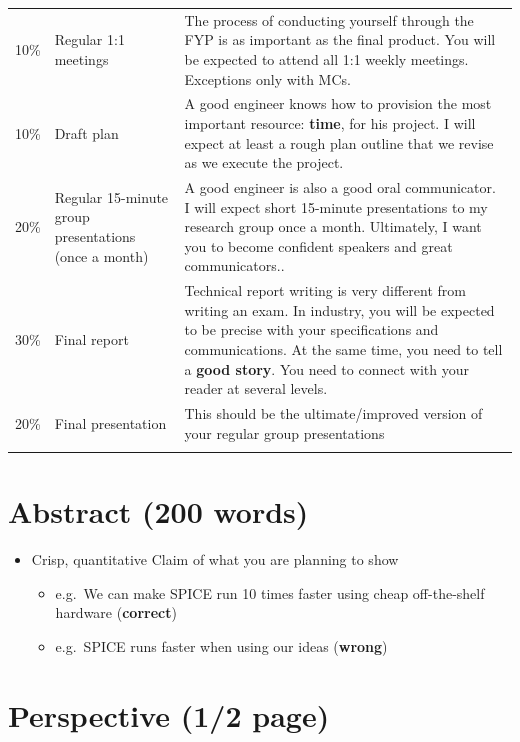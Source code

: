 \begin{longtable}[c]{@{}llp{4cm}@{}}
\hline\noalign{\medskip}
10\% & Regular 1:1 meetings & The process of conducting
yourself through the FYP is as important as the final
product. You will be expected to attend all 1:1 weekly
meetings. Exceptions only with MCs.
\\\noalign{\medskip}
10\% & Draft plan & A good engineer knows how to provision
the most important resource: \textbf{time}, for his project.
I will expect at least a rough plan outline that we revise
as we execute the project.
\\\noalign{\medskip}
20\% & Regular 15-minute group presentations (once a month)
& A good engineer is also a good oral communicator. I will
expect short 15-minute presentations to my research group
once a month. Ultimately, I want you to become confident
speakers and great communicators..
\\\noalign{\medskip}
30\% & Final report & Technical report writing is very
different from writing an exam. In industry, you will be
expected to be precise with your specifications and
communications. At the same time, you need to tell a
\textbf{good story}. You need to connect with your reader at
several levels.
\\\noalign{\medskip}
20\% & Final presentation & This should be the
ultimate/improved version of your regular group
presentations
\\\noalign{\medskip}
\hline
\end{longtable}

\section{Abstract (200 words)}

\begin{itemize}
\itemsep1pt\parskip0pt
\item
  Crisp, quantitative Claim of what you are planning to show

  \begin{itemize}
  \itemsep1pt\parskip0pt
  \item
    e.g.~We can make SPICE run 10 times faster using cheap
    off-the-shelf hardware (\textbf{correct})
  \item
    e.g.~SPICE runs faster when using our ideas
    (\textbf{wrong})
  \end{itemize}
\end{itemize}

\section{Perspective (1/2 page)}

